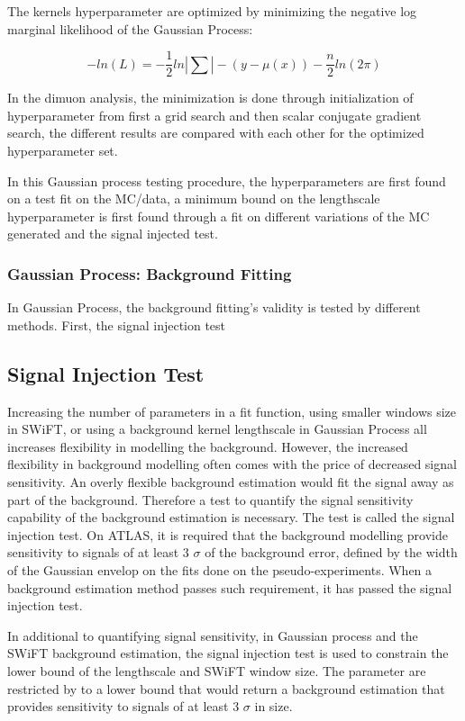     The kernels hyperparameter are optimized by minimizing the negative log marginal likelihood of the Gaussian Process:

    \begin{equation}
        -ln(L) = -\frac{1}{2} ln |\sum| - (y-\mu(x) ) - \frac{n}{2}ln(2\pi)
    \label{eq:loglikelihood}
    \end{equation}
    
    In the dimuon analysis, the minimization is done through initialization of hyperparameter from first a grid search and then scalar conjugate gradient search, the different results are compared with each other for the optimized hyperparameter set.

    In this Gaussian process testing procedure, the hyperparameters are first found on a test fit on the MC/data, a minimum bound on the lengthscale hyperparameter is first found through a fit on different variations of the MC generated and the signal injected test.

\subsubsection{Gaussian Process: Background Fitting}
In Gaussian Process, the background fitting's validity is tested by different methods. First, the signal injection test 

\subsection{Signal Injection Test}
    \label{sec:signalInjection}
    Increasing the number of parameters in a fit function, using smaller windows size in SWiFT, or using a background kernel lengthscale in Gaussian Process all increases flexibility in modelling the background. However, the increased flexibility in background modelling often comes with the price of decreased signal sensitivity. An overly flexible background estimation would fit the signal away as part of the background. 
    Therefore a test to quantify the signal sensitivity capability of the background estimation is necessary. The test is called the signal injection test. On ATLAS, it is required that the background modelling provide sensitivity to signals of at least 3 $\sigma$ of the background error, defined by the width of the Gaussian envelop on the fits done on the pseudo-experiments. When a background estimation method passes such requirement, it has passed the signal injection test.

    In additional to quantifying signal sensitivity, in Gaussian process and the SWiFT background estimation, the signal injection test is used to constrain the lower bound of the lengthscale and SWiFT window size.
    The parameter are restricted by to a lower bound that would return a background estimation that provides sensitivity to signals of at least 3 $\sigma$ in size.

